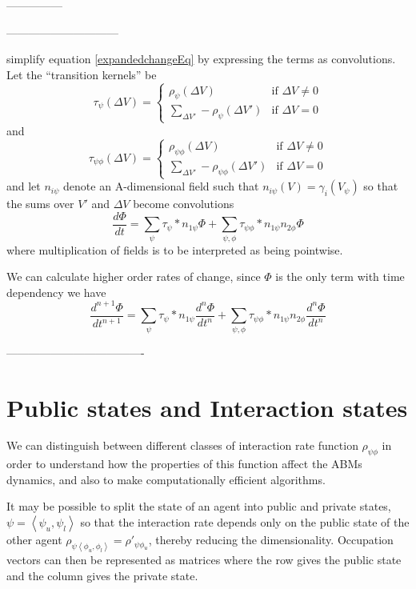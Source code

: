 \documentclass[a4paper]{article}
\begin{document}
---------------


------------------------------

simplify equation \ref{expandedchangeEq} by expressing the terms as convolutions. Let the ``transition kernels'' be
\[
\tau_\psi(\Delta V) = 
\begin{cases}
	\rho_\psi(\Delta V) & \text{if } \Delta V \ne 0\\
	\sum_{\Delta V'} -\rho_\psi(\Delta V') & \text{if } \Delta V = 0
\end{cases}
\]
and
\[
\tau_{\psi\phi}(\Delta V) = 
\begin{cases}
	\rho_{\psi\phi}(\Delta V) & \text{if } \Delta V \ne 0\\
	\sum_{\Delta V'} -\rho_{\psi\phi}(\Delta V') & \text{if } \Delta V = 0
\end{cases}
\]
and let $n_{i\psi}$ denote an A-dimensional field such that $n_{i\psi}(V) = \gamma_i(V_\psi)$ so that the sums over $V'$ and $\Delta V$ become convolutions
\begin{equation}
\frac{d\Phi}{dt} = 
\sum_{\psi}\tau_\psi \ast n_{1\psi}\Phi
+ \sum_{\psi,\phi}  \tau_{\psi\phi} \ast n_{1\psi}n_{2\phi}\Phi
\end{equation}
where multiplication of fields is to be interpreted as being pointwise.

We can calculate higher order rates of change, since $\Phi$ is the only term with time dependency we have 
\begin{equation}
	\frac{d^{n+1}\Phi}{dt^{n+1}} = 
	\sum_{\psi}\tau_\psi \ast n_{1\psi} \frac{d^n\Phi}{dt^n}
	+ \sum_{\psi,\phi}  \tau_{\psi\phi} \ast n_{1\psi}n_{2\phi} \frac{d^n\Phi}{dt^n}
\end{equation}

-------------------------------------

\section{Public states and Interaction states}

We can distinguish between different classes of interaction rate function $\rho_{\psi\phi}$ in order to understand how the properties of this function affect the ABMs dynamics, and also to make computationally efficient algorithms.

It may be possible to split the state of an agent into public and private states, $\psi = \left<\psi_u, \psi_l\right>$ so that the interaction rate depends only on the public state of the other agent $\rho_{\psi\left<\phi_u,\phi_l\right>} = \rho'_{\psi\phi_u}$, thereby reducing the dimensionality. Occupation vectors can then be represented as matrices where the row gives the public state and the column gives the private state.
\end{document}
